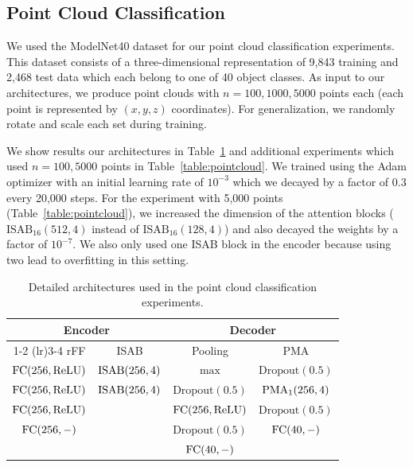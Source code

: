 \documentclass{article}
\begin{document}
\subsection{Point Cloud Classification}
\label{app:point_cloud}
We used the ModelNet40 dataset for our point cloud classification experiments.
This dataset consists of a three-dimensional representation of 9,843 training and 2,468 test data which each belong to one of 40 object classes.
As input to our architectures, we produce point clouds with $n=100, 1000, 5000$ points each (each point is represented by $(x,y,z)$ coordinates).
For generalization, we randomly rotate and scale each set during training.

We show results our architectures in Table~\ref{tab:pointcloud_architecture} and additional experiments which used $n=100, 5000$ points in Table~\ref{table:pointcloud}.
We trained using the Adam optimizer with an initial learning rate of $10^{-3}$ which we decayed by a factor of $0.3$ every 20,000 steps.
For the experiment with 5,000 points (Table~\ref{table:pointcloud}), we increased the dimension of the attention blocks ($\mathrm{ISAB}_{16}(512, 4)$ instead of $\mathrm{ISAB}_{16}(128, 4)$) and also decayed the weights by a factor of $10^{-7}$.
We also only used one ISAB block in the encoder because using two lead to overfitting in this setting.

\begin{table}[h]
\small
\centering
\caption{Detailed architectures used in the point cloud classification experiments.}
\vspace{5pt}
\begin{tabular}{@{}cccc@{}}\toprule
\multicolumn{2}{c}{Encoder} & \multicolumn{2}{c}{Decoder}\\
\cmidrule(lr){1-2} \cmidrule(lr){3-4}
rFF & ISAB & Pooling & PMA \\
\midrule
$\mathrm{FC}(256, \mathrm{ReLU})$ & $\mathrm{ISAB}(256, 4)$ & $\max$& $\mathrm{Dropout}(0.5)$ \\
$\mathrm{FC}(256, \mathrm{ReLU})$  & $\mathrm{ISAB}(256, 4)$ & $\mathrm{Dropout}(0.5)$ & $\mathrm{PMA}_1(256, 4)$ \\
$\mathrm{FC}(256, \mathrm{ReLU})$  & & $\mathrm{FC}(256, \mathrm{ReLU})$ & $\mathrm{Dropout}(0.5)$ \\
$\mathrm{FC}(256, -)$ & &$\mathrm{Dropout}(0.5)$ & $\mathrm{FC}(40, -)$ \\
&&$\mathrm{FC}(40, -)$ &\\
\bottomrule
\end{tabular}
\label{tab:pointcloud_architecture}
\end{table}
\end{document}
